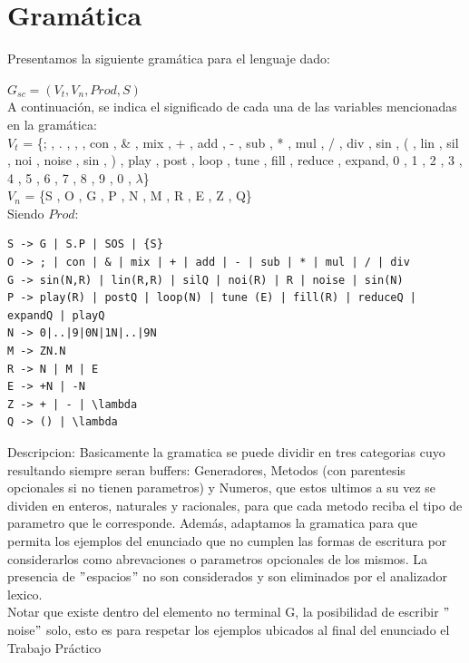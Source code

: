 \documentclass[a4paper,titlepage,10pt]{article}
\begin{document}

\maketitle

\section{Gramática}
Presentamos la siguiente gramática para el lenguaje dado:

$G_{sc} = (V_t,V_n,Prod,S)$\\

A continuación, se indica el significado de cada una de las variables mencionadas en la gramática: \\

$V_t$ = \{; , . , { , } , con , \& , mix , + , add , - , sub , * , mul , / , div , sin , ( , 
	lin , sil , noi , noise , sin , ) , play , post , loop , tune , fill , reduce , expand,
	0 , 1 , 2 , 3 , 4 , 5 , 6 , 7 , 8 , 9 , 0 , $\lambda$\}\\

$V_n$ = \{S , O , G , P , N , M , R , E , Z , Q\}\\

Siendo $Prod$:

\begin{verbatim}
S -> G | S.P | SOS | {S}
O -> ; | con | & | mix | + | add | - | sub | * | mul | / | div
G -> sin(N,R) | lin(R,R) | silQ | noi(R) | R | noise | sin(N)
P -> play(R) | postQ | loop(N) | tune (E) | fill(R) | reduceQ | expandQ | playQ
N -> 0|..|9|0N|1N|..|9N
M -> ZN.N
R -> N | M | E
E -> +N | -N 
Z -> + | - | \lambda
Q -> () | \lambda
\end{verbatim}

Descripcion:
Basicamente la gramatica se puede dividir en tres categorias cuyo resultando siempre seran buffers: Generadores, Metodos (con parentesis opcionales si no tienen parametros) y Numeros, que estos ultimos a su vez se dividen en enteros, naturales y racionales, para que cada metodo reciba el tipo de parametro que le corresponde. Además, adaptamos la gramatica para que permita los ejemplos del enunciado que no cumplen las formas de escritura por considerarlos como abrevaciones o parametros opcionales de los mismos. 
La presencia de $"$espacios$"$ no son considerados y son eliminados por el analizador lexico.\\
Notar que existe dentro del elemento no terminal G, la posibilidad de escribir $"$noise$"$ solo, esto es para respetar los ejemplos ubicados al final del enunciado el Trabajo Práctico
\end{document}
